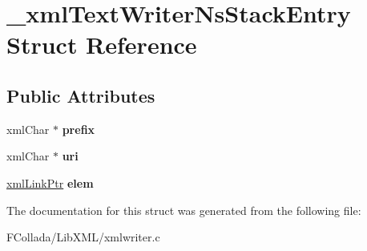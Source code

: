 \hypertarget{struct__xmlTextWriterNsStackEntry}{
\section{\_\-xmlTextWriterNsStackEntry Struct Reference}
\label{struct__xmlTextWriterNsStackEntry}
}
\subsection*{Public Attributes}
\begin{DoxyCompactItemize}
\item 
\hypertarget{struct__xmlTextWriterNsStackEntry_ad00516c4abbf4c592b7e69306d873f1e}{
xmlChar $\ast$ {\bfseries prefix}}
\label{struct__xmlTextWriterNsStackEntry_ad00516c4abbf4c592b7e69306d873f1e}

\item 
\hypertarget{struct__xmlTextWriterNsStackEntry_a0f7c88ce08d1758e8b63583b9ffe8ac6}{
xmlChar $\ast$ {\bfseries uri}}
\label{struct__xmlTextWriterNsStackEntry_a0f7c88ce08d1758e8b63583b9ffe8ac6}

\item 
\hypertarget{struct__xmlTextWriterNsStackEntry_aaf3b9e0f6e766449277a6818bbda3a32}{
\hyperlink{struct__xmlLink}{xmlLinkPtr} {\bfseries elem}}
\label{struct__xmlTextWriterNsStackEntry_aaf3b9e0f6e766449277a6818bbda3a32}

\end{DoxyCompactItemize}


The documentation for this struct was generated from the following file:\begin{DoxyCompactItemize}
\item 
FCollada/LibXML/xmlwriter.c\end{DoxyCompactItemize}
